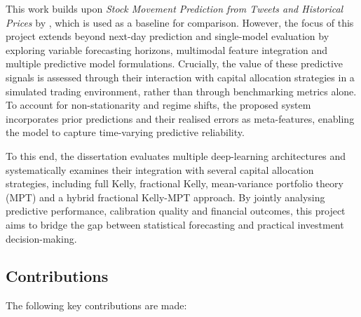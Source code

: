 \documentclass{l4proj}
\begin{document}
This work builds upon \textit{Stock Movement Prediction from Tweets and Historical Prices} by \citet{xu-cohen-2018-stock}, which is used as a baseline for comparison. However, the focus of this project extends beyond next-day prediction and single-model evaluation by exploring variable forecasting horizons, multimodal feature integration and multiple predictive model formulations. Crucially, the value of these predictive signals is assessed through their interaction with capital allocation strategies in a simulated trading environment, rather than through benchmarking metrics alone. To account for non-stationarity and regime shifts, the proposed system incorporates prior predictions and their realised errors as meta-features, enabling the model to capture time-varying predictive reliability.

To this end, the dissertation evaluates multiple deep-learning architectures and systematically examines their integration with several capital allocation strategies, including full Kelly, fractional Kelly, mean-variance portfolio theory (MPT) and a hybrid fractional Kelly-MPT approach. By jointly analysing predictive performance, calibration quality and financial outcomes, this project aims to bridge the gap between statistical forecasting and practical investment decision-making.

\subsection{Contributions}

The following key contributions are made:
\end{document}

